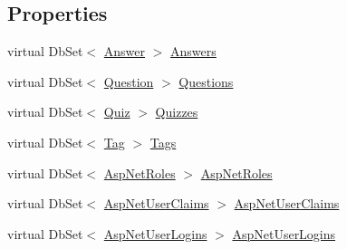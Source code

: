 \subsection*{Properties}
\begin{DoxyCompactItemize}
\item 
virtual Db\+Set$<$ \hyperlink{class_website_1_1_models_1_1_answer}{Answer} $>$ \hyperlink{class_website_1_1_models_1_1_quiz_creator_context_afc95ea074c2a4451ecef26082e4ff4de}{Answers}
\item 
virtual Db\+Set$<$ \hyperlink{class_website_1_1_models_1_1_question}{Question} $>$ \hyperlink{class_website_1_1_models_1_1_quiz_creator_context_a9e68b659cc30a902a00f0c396eeee821}{Questions}
\item 
virtual Db\+Set$<$ \hyperlink{class_website_1_1_models_1_1_quiz}{Quiz} $>$ \hyperlink{class_website_1_1_models_1_1_quiz_creator_context_a3ab4659584718d73d72375af3b5c803f}{Quizzes}
\item 
virtual Db\+Set$<$ \hyperlink{class_website_1_1_models_1_1_tag}{Tag} $>$ \hyperlink{class_website_1_1_models_1_1_quiz_creator_context_a56c72441f4de63aef839a5550f160471}{Tags}
\item 
virtual Db\+Set$<$ \hyperlink{class_website_1_1_asp_net_roles}{Asp\+Net\+Roles} $>$ \hyperlink{class_website_1_1_models_1_1_quiz_creator_context_ac37c54c66f303a8f0b4e6b58df6910ac}{Asp\+Net\+Roles}
\item 
virtual Db\+Set$<$ \hyperlink{class_website_1_1_asp_net_user_claims}{Asp\+Net\+User\+Claims} $>$ \hyperlink{class_website_1_1_models_1_1_quiz_creator_context_ad8dc56b9e8485646bf6c6a179566a4a8}{Asp\+Net\+User\+Claims}
\item 
virtual Db\+Set$<$ \hyperlink{class_website_1_1_asp_net_user_logins}{Asp\+Net\+User\+Logins} $>$ \hyperlink{class_website_1_1_models_1_1_quiz_creator_context_a8f0e3294fcc8f6ca7606865712ae2c89}{Asp\+Net\+User\+Logins}
\item 

\end{DoxyCompactItemize}
